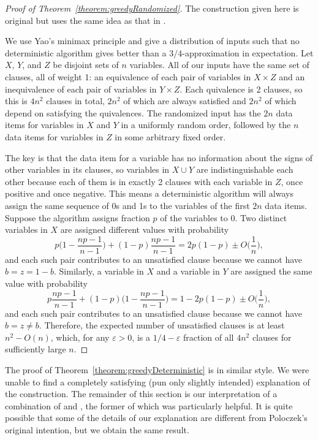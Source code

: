 \documentclass[11pt,letter]{article}
\numberwithin{theorem}{section}
\renewcommand{\epsilon}{\varepsilon}
\begin{document}
\begin{proof}[Proof of Theorem~\ref{theorem:greedyRandomized}]
  The construction given here is original
  but uses the same idea as that in \cite{DBLP:conf/esa/Poloczek11}.

  We use Yao's minimax principle \cite{Yao}
  and give a distribution of inputs
  such that no deterministic algorithm gives better than a $3/4$-approximation
  in expectation.
  Let $X$, $Y$, and $Z$ be disjoint sets of $n$ variables.
  All of our inputs have the same set of clauses, all of weight 1:
  an equivalence of each pair of variables in $X \times Z$
  and an inequivalence of each pair of variables in $Y \times Z$.
  Each quivalence is 2 clauses, so this is $4n^2$ clauses in total,
  $2n^2$ of which are always satisfied
  and $2n^2$ of which depend on satisfying the quivalences.
  The randomized input has the $2n$ data items for variables in $X$ and $Y$
  in a uniformly random order,
  followed by the $n$ data items for variables in $Z$
  in some arbitrary fixed order.

  The key is that the data item for a variable has no information about
  the signs of other variables in its clauses,
  so variables in $X \cup Y$ are indistinguishable each other
  because each of them is in exactly 2 clauses with each variable in $Z$,
  once positive and once negative.
  This means a deterministic algorithm will always assign
  the same sequence of 0s and 1s
  to the variables of the first $2n$ data items.
  Suppose the algorithm assigns fraction $p$ of the variables to 0.
  Two distinct variables in $X$ are assigned different values
  with probability
  \[
    p\bigg(1-\frac{np-1}{n-1}\bigg) + (1-p)\frac{np-1}{n-1}
    = 2p(1-p) \pm O\bigg(\frac{1}{n}\bigg),
  \]
  and each such pair contributes to an unsatisfied clause
  because we cannot have $b = z = 1-b$.
  Similarly, a variable in $X$ and a variable in $Y$
  are assigned the same value with probability
  \[
    p\frac{np-1}{n-1} + (1-p)\bigg(1-\frac{np-1}{n-1}\bigg)
    = 1 - 2p(1-p) \pm O\bigg(\frac{1}{n}\bigg),
  \]
  and each such pair contributes to an unsatisfied clause
  because we cannot have $b = z \neq b$.
  Therefore, the expected number of unsatisfied clauses
  is at least $n^2 - O(n)$,
  which, for any $\epsilon > 0$,
  is a $1/4 - \epsilon$ fraction of all $4n^2$ clauses
  for sufficiently large $n$.
\end{proof}

The proof of Theorem~\ref{theorem:greedyDeterministic} is in similar style.
We were unable to find a completely satisfying
(pun only slightly intended)
explanation of the construction.
The remainder of this section is our interpretation of a combination of
\cite{PoloczekVideo} and \cite{DBLP:conf/esa/Poloczek11},
the former of which was particularly helpful.
It is quite possible that some of the details of our explanation
are different from Poloczek's original intention,
but we obtain the same result.
\end{document}
